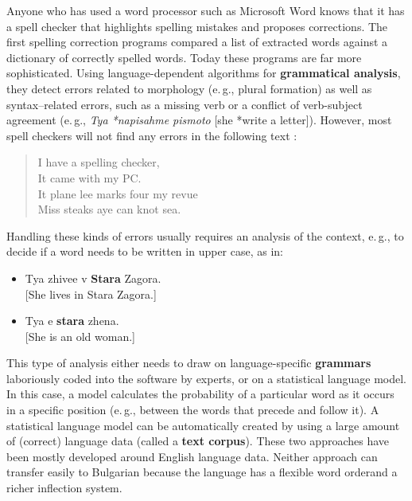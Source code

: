 \documentclass[]{../../metanetpaper}
\begin{document}
\begin{multicols}{2}
Anyone who has used a word processor such as Microsoft Word knows that it has a spell checker that highlights spelling mistakes and proposes corrections. The first spelling correction programs compared a list of extracted words against a dictionary of correctly spelled words. Today these programs are far more sophisticated. Using language-dependent algorithms for \textbf{grammatical analysis}, they detect errors related to morphology (e.\,g., plural formation) as well as syntax–related errors, such as a missing verb or a conflict of verb-subject agreement  (e.\,g., \textit{Tya *napisahme pismoto} [she *write a letter]). However, most spell checkers will not find any errors in the following text \cite{zar1}:

\begin{quote}
  I have a spelling checker,\\
  It came with my PC.\\
  It plane lee marks four my revue\\
  Miss steaks aye can knot sea.
\end{quote}

Handling these kinds of errors usually requires an analysis of the context, e.\,g., to decide if a word needs to be written in upper case, as in:

\begin{itemize}
\item Tya zhivee v \textbf{Stara} Zagora.\\ {[}She lives in Stara Zagora.{]} 
\item Tya e \textbf{stara} zhena.\\ {[}She is an old woman.{]}
\end{itemize}

This type of analysis either needs to draw on language-specific \textbf{grammars} laboriously coded into the software by experts, or on a statistical language model. In this case, a model calculates the probability of a particular word as it occurs in a specific position (e.\,g., between the words that precede and follow it). A statistical language model can be automatically created by using a large amount of (correct) language data (called a \textbf{text corpus}). These two approaches have been mostly developed around English language data. Neither approach can transfer easily to Bulgarian because the language has a flexible word orderand a richer inflection system. 


\end{multicols}
\end{document}
